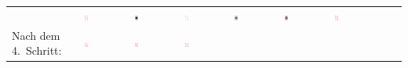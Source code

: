 \begin{tabular}{m{30mm}m{11mm}m{11mm}m{11mm}m{11mm}m{11mm}m{11mm}m{11mm}m{11mm}}
&
\includegraphics[width=0.08\textwidth]{./inf/SEKII/19_Java_Sortierverfahren/Karo9.png}
&
\includegraphics[width=0.08\textwidth]{./inf/SEKII/19_Java_Sortierverfahren/KaroBube.png}
&
\includegraphics[width=0.08\textwidth]{./inf/SEKII/19_Java_Sortierverfahren/KaroAs.png}
&
\includegraphics[width=0.08\textwidth]{./inf/SEKII/19_Java_Sortierverfahren/KaroKoenig.png}
&
\includegraphics[width=0.08\textwidth]{./inf/SEKII/19_Java_Sortierverfahren/KaroDame.png}
&
\includegraphics[width=0.08\textwidth]{./inf/SEKII/19_Java_Sortierverfahren/Karo10.png}
\\
Nach dem 4.\ Schritt: &
\includegraphics[width=0.08\textwidth]{./inf/SEKII/19_Java_Sortierverfahren/Karo7.png}
&
\includegraphics[width=0.08\textwidth]{./inf/SEKII/19_Java_Sortierverfahren/Karo8.png}
&
\includegraphics[width=0.08\textwidth]{./inf/SEKII/19_Java_Sortierverfahren/Karo9.png}

\end{tabular}
